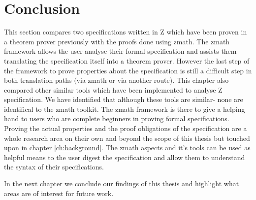 \section{Conclusion}
This section compares two specifications written in Z which have been proven in a
theorem prover previously with the proofs done using \gls{zmath}. The
\gls{zmath} framework allows the user analyse their formal specification and
assists them translating the specification itself into a theorem prover. However
the last step of the framework to prove properties about the specification is
still a difficult step in both translation paths (via \gls{zmath} or via another
route). This chapter also compared other similar tools which have been
implemented to analyse Z specification. We have identified that although these
tools are similar- none are identifical to the \gls{zmath} toolkit.
The \gls{zmath} framework is there to give a helping hand to
users who are complete beginners in proving formal specifications. Proving the
actual properties and the proof obligations of the specification are a whole
research area on their own and beyond the scope of this thesis but touched upon
in chapter \ref{ch:background}. The \gls{zmath} aspects and it's tools can be used as helpful means to the user digest 
the specification and allow them to understand the syntax of their specifications.

In the next chapter we conclude our findings of this thesis and highlight what
areas are of interest for future work.

